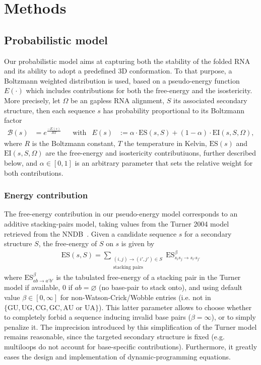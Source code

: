 \section{Methods}
\label{sec:methods}

\newcommand{\PE}[1]{E(#1)}
\newcommand{\EI}{\text{EI}}
\newcommand{\ES}{\text{ES}}
\newcommand{\ISO}{\text{ISO}}

\subsection{Probabilistic model}
Our probabilistic model aims at capturing both the stability of the folded RNA and its ability to adopt a predefined 3D conformation.
To that purpose, a Boltzmann weighted distribution is used, based on a pseudo-energy function $\PE{\cdot}$ which includes contributions for both 
the free-energy and the isostericity. 
More precisely, let $\Omega$ be an gapless RNA alignment, $S$ its associated secondary structure, 
then each sequence $s$ has probability proportional to its Boltzmann factor
\begin{align*}
  \mathcal{B}(s) &= e^\frac{-\PE{s}}{RT} &&\text{with}&\PE{s}&:=\alpha\cdot\ES(s,S)+(1-\alpha)\cdot\EI(s,S,\Omega),
\end{align*}
where $R$ is the Boltzmann constant, $T$ the temperature in Kelvin, $\ES(s)$ and $\EI(s,S,\Omega)$ are the free-energy and isostericity contributiuons, further described below, and $\alpha\in[0,1]$ is an arbitrary parameter that sets the relative weight for both contributions.

\subsubsection{Energy contribution}
The free-energy contribution in our pseudo-energy model corresponds to an additive stacking-pairs model, taking values from the Turner 2004 model retrieved from the NNDB~\cite{Turner2010}. Given a candidate sequence $s$ for a secondary structure $S$, the free-energy of $S$ on $s$ is given by
\begin{align*}
  \ES(s,S) = \sum_{\substack{(i,j)\to (i',j')\in S\\ \text{stacking pairs}}}\ES^{\beta}_{s_is_j\to s_{i'}s_{j'}} 
\end{align*}
where $\ES^{\beta}_{ab\to a'b'}$ is the tabulated free-energy of a stacking pair in the Turner model if available, $0$ if $ab=\varnothing$ (no base-pair to stack onto), and using default value $\beta\in[0,\infty]$ for non-Watson-Crick/Wobble entries (i.e. not in $\{\text{GU},\text{UG},\text{CG},\text{GC}, \text{AU or UA}\}$). This latter parameter allows to choose whether to completely forbid a sequence inducing invalid base pairs ($\beta = \infty$), or to simply penalize it.
The imprecision introduced by this simplification of the Turner model remains reasonable, since the targeted secondary structure is fixed 
(e.g. multiloops do not account for base-specific contributions). Furthermore, it greatly eases the design and implementation of dynamic-programming equations. 

